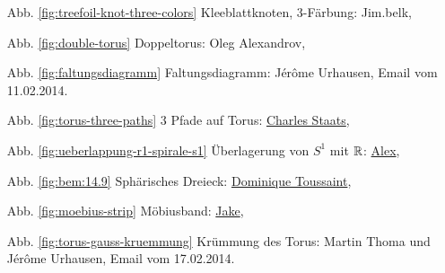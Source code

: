 \begin{itemize}
    \item[Abb. \ref{fig:treefoil-knot-three-colors}] Kleeblattknoten, 3-Färbung: Jim.belk, \href{https://commons.wikimedia.org/wiki/File:Tricoloring.png}{}
    \item[Abb. \ref{fig:double-torus}] Doppeltorus: Oleg Alexandrov, \href{https://commons.wikimedia.org/wiki/File:Double_torus_illustration.png}{}
    \item[Abb. \ref{fig:faltungsdiagramm}] Faltungsdiagramm: Jérôme Urhausen, Email vom 11.02.2014.
    \item[Abb. \ref{fig:torus-three-paths}] 3 Pfade auf Torus: \href{http://tex.stackexchange.com/users/484/charles-staats}{Charles Staats}, \href{http://tex.stackexchange.com/a/149991/5645}{}
    \item[Abb. \ref{fig:ueberlappung-r1-spirale-s1}] Überlagerung von $S^1$ mit $\mathbb{R}$: \href{http://tex.stackexchange.com/users/22467/alex}{Alex}, \href{http://tex.stackexchange.com/a/149706/5645}{}
    \item[Abb. \ref{fig:bem:14.9}] Sphärisches Dreieck: \href{https://commons.wikimedia.org/wiki/User:DemonDeLuxe}{Dominique Toussaint},\\
        \href{https://commons.wikimedia.org/wiki/File:Spherical_triangle_3d_opti.png}{}
    \item[Abb. \ref{fig:moebius-strip}] Möbiusband: \href{http://tex.stackexchange.com/users/2552/jake}{Jake},
        \href{http://tex.stackexchange.com/a/118573/5645}{}
    \item[Abb. \ref{fig:torus-gauss-kruemmung}] Krümmung des Torus: Martin Thoma und Jérôme Urhausen, Email vom 17.02.2014.
\end{itemize}
